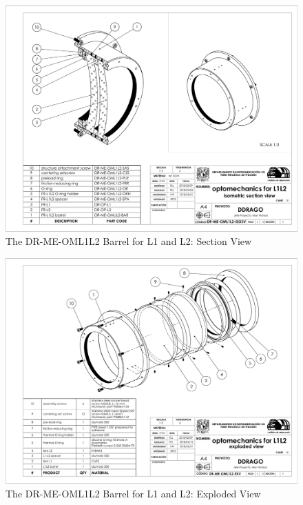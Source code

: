 \documentclass{article}
\begin{document}
\begin{figure}
\begin{center}
\includegraphics[height=\linewidth,angle=90]{figures/DR-ME-OML1L2-ISOSV}
\end{center}
\caption{The DR-ME-OML1L2 Barrel for L1 and L2: Section View}
\label{figure:rosalia-oml1l2-section}
\end{figure}

\begin{figure}
\begin{center}
\includegraphics[height=\linewidth,angle=90]{figures/DR-ME-OML1L2-EXV}
\end{center}
\caption{The DR-ME-OML1L2 Barrel for L1 and L2: Exploded View}
\label{figure:rosalia-oml1l2-exploded}
\end{figure}
\end{document}
